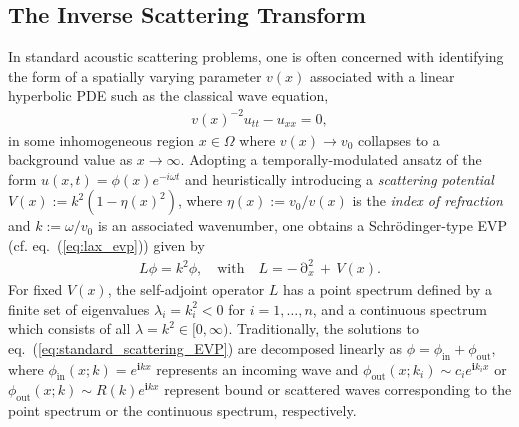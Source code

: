 \documentclass[journal=gmj]{CUP-JNL-DTM}%
\DeclareMathOperator{\pt}{\partial}
\theoremstyle{definition}
\numberwithin{equation}{section}
\begin{document}
\subsection{The Inverse Scattering Transform}\label{subsec:IST}
In standard acoustic scattering problems, one is often concerned with identifying the form of a spatially varying parameter $v(x)$ associated with a linear hyperbolic PDE such as the classical wave equation, \begin{align*}
    v(x)^{-2} u_{tt} - u_{xx} = 0,
\end{align*} in some inhomogeneous region $x \in \Omega$ where $v(x) \rightarrow v_0$ collapses to a background value as $x \rightarrow \infty$. Adopting a temporally-modulated ansatz of the form $u(x,t) = \phi(x) e^{-i\omega{t}}$ and heuristically introducing a \textit{scattering potential} $V(x) := k^2(1 - \eta(x)^2)$, where $\eta(x) := v_0/v(x)$ is the \textit{index of refraction} and $k := \omega/v_0$ is an associated wavenumber, one obtains a Schr\"odinger-type EVP (cf. eq.~(\ref{eq:lax_evp})) given by \begin{align}\label{eq:standard_scattering_EVP}
    L\phi = k^2\phi,
    \quad \text{with} \quad
    L = -\pt^2_{\!x} \, + \, V(x).
\end{align} For fixed $V(x)$, the self-adjoint operator $L$ has a point spectrum defined by a finite set of eigenvalues $\lambda_i = k^2_i < 0$ for $i = 1, \dots, n$, and a continuous spectrum which consists of all $\lambda = k^2 \in [0,\infty)$. Traditionally, the solutions to eq.~(\ref{eq:standard_scattering_EVP}) are decomposed linearly as $\phi = \phi_{\text{in}} + \phi_{\text{out}}$, where $\phi_{\text{in}}(x;k) = e^{\boldsymbol{i}kx}$ represents an incoming wave and $\phi_{\text{out}}(x;k_i) \sim c_ie^{\boldsymbol{i}k_ix}$ or $\phi_{\text{out}}(x;k) \sim R(k)e^{\boldsymbol{i}kx}$ represent bound or scattered waves corresponding to the point spectrum or the continuous spectrum, respectively.

\smallskip
\end{document}
